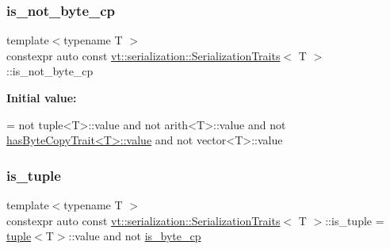 \mbox{\label{structvt_1_1serialization_1_1_serialization_traits_a2cc60efbf5ab3c003a6b7a923794ccac}} 
\subsubsection{\texorpdfstring{is\+\_\+not\+\_\+byte\+\_\+cp}{is\_not\_byte\_cp}}
{\footnotesize\ttfamily template$<$typename T $>$ \\
constexpr auto const \hyperlink{structvt_1_1serialization_1_1_serialization_traits}{vt\+::serialization\+::\+Serialization\+Traits}$<$ T $>$\+::is\+\_\+not\+\_\+byte\+\_\+cp\hspace{0.3cm}{\ttfamily [static]}}

{\bfseries Initial value\+:}
\begin{DoxyCode}
=
    not tuple<T>::value and
    not arith<T>::value and
    not \hyperlink{structvt_1_1serialization_1_1has_byte_copy_trait_ab0e433e90af4c3f2b8b6353fb2bbd34c}{hasByteCopyTrait<T>::value} and
    not vector<T>::value
\end{DoxyCode}
\mbox{\label{structvt_1_1serialization_1_1_serialization_traits_a2a0b40d56694871797b9359f430ec731}} 
\subsubsection{\texorpdfstring{is\+\_\+tuple}{is\_tuple}}
{\footnotesize\ttfamily template$<$typename T $>$ \\
constexpr auto const \hyperlink{structvt_1_1serialization_1_1_serialization_traits}{vt\+::serialization\+::\+Serialization\+Traits}$<$ T $>$\+::is\+\_\+tuple = \hyperlink{structvt_1_1serialization_1_1_serialization_traits_ab7e5dd1f060f8077a26dc1c539e7c4fa}{tuple}$<$T$>$\+::value and not \hyperlink{structvt_1_1serialization_1_1_serialization_traits_a38a97b8b969de14ff2893c1ebcb11aba}{is\+\_\+byte\+\_\+cp}\hspace{0.3cm}{\ttfamily [static]}}

